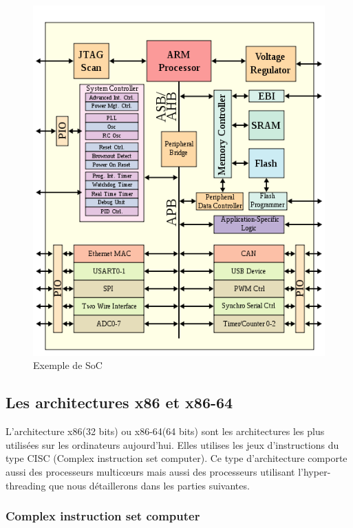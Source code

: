 \begin{figure}[h!]
\begin{center}
	\includegraphics[scale=0.9]{ARMSoCBlockDiagram.png}
	\caption{Exemple de SoC}
\end{center}
\end{figure}

\clearpage

\subsection{ Les architectures x86 et x86-64 }

L'architecture x86(32 bits) ou x86-64(64 bits) sont les architectures les plus utilisées sur les ordinateurs aujourd'hui. Elles utilises les jeux d'instructions du type CISC (Complex instruction set computer). Ce type d'architecture comporte aussi des processeurs multicœurs mais aussi des processeurs utilisant l'hyper-threading que nous détaillerons dans les parties suivantes.

\subsubsection{ Complex instruction set computer }


